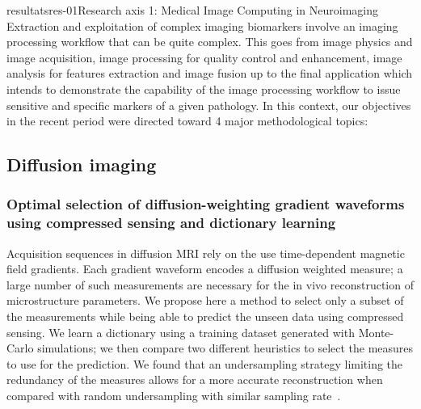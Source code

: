 \documentclass{ra2018}
\begin{document}
\begin{module}{resultats}{res-01}{Research axis 1: Medical Image Computing in Neuroimaging}
Extraction and exploitation of complex imaging biomarkers involve an imaging processing workflow that can be quite complex. This goes from image physics and image acquisition, image processing for quality control and enhancement, image analysis for features extraction and image fusion up to the final application which intends to demonstrate the capability of the image processing workflow to issue sensitive and specific markers of a given pathology. In this context, our objectives in the recent period were directed toward 4 major methodological topics:

\subsection{Diffusion imaging}

\subsubsection{Optimal selection of diffusion-weighting gradient waveforms using compressed sensing and dictionary learning}
\begin{participants}
\end{participants}
Acquisition sequences in diffusion MRI rely on the use time-dependent magnetic field gradients. Each gradient waveform encodes a diffusion weighted measure; a large number of such measurements are necessary for the in vivo reconstruction of microstructure parameters. We propose here a method to select only a subset of the measurements while being able to predict the unseen data using compressed sensing. We learn a dictionary using a training dataset generated with Monte-Carlo simulations; we then compare two different heuristics to select the measures to use for the prediction. We found that an undersampling strategy limiting the redundancy of the measures allows for a more accurate reconstruction when compared with random undersampling with similar sampling rate~\cite{truffet:inserm-01939066}.


\end{module}
\end{document}
